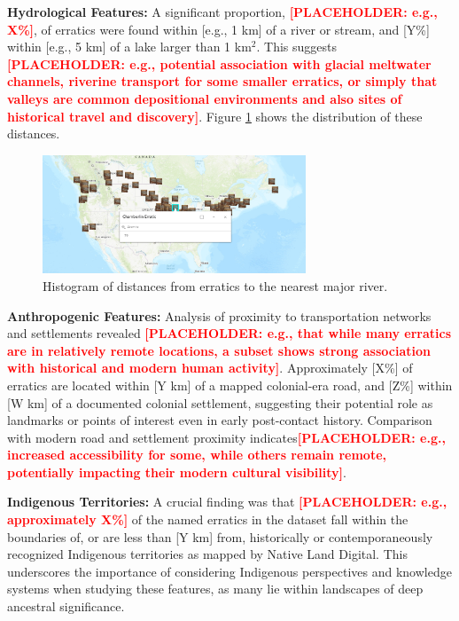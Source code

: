 \documentclass[
11pt, %
english, %
singlespacing, %
headsepline, %
]{MastersDoctoralThesis} %
\newcommand{\placeholdertext}[1]{\textcolor{red}{\textbf{[PLACEHOLDER: #1]}}}
\begin{document}
\textbf{Hydrological Features:} A significant proportion, \placeholdertext{e.g., X\%}, of erratics were found within [e.g., 1 km] of a river or stream, and [Y\%] within [e.g., 5 km] of a lake larger than 1 km$^2$. This suggests \placeholdertext{e.g., potential association with glacial meltwater channels, riverine transport for some smaller erratics, or simply that valleys are common depositional environments and also sites of historical travel and discovery}. Figure \ref{fig:dist_to_water_hist} shows the distribution of these distances.

\begin{figure}[H]
    \centering
    \includegraphics[width=0.7\textwidth]{Images/DigitizedMap.png} %
    \caption{Histogram of distances from erratics to the nearest major river.}
    \label{fig:dist_to_water_hist}
\end{figure}

\textbf{Anthropogenic Features:}
Analysis of proximity to transportation networks and settlements revealed \placeholdertext{e.g., that while many erratics are in relatively remote locations, a subset shows strong association with historical and modern human activity}. Approximately [X\%] of erratics are located within [Y km] of a mapped colonial-era road, and [Z\%] within [W km] of a documented colonial settlement, suggesting their potential role as landmarks or points of interest even in early post-contact history. Comparison with modern road and settlement proximity indicates\placeholdertext{e.g., increased accessibility for some, while others remain remote, potentially impacting their modern cultural visibility}.

\textbf{Indigenous Territories:}
A crucial finding was that \placeholdertext{e.g., approximately X\%} of the named erratics in the dataset fall within the boundaries of, or are less than [Y km] from, historically or contemporaneously recognized Indigenous territories as mapped by Native Land Digital. This underscores the importance of considering Indigenous perspectives and knowledge systems when studying these features, as many lie within landscapes of deep ancestral significance.
\end{document}
